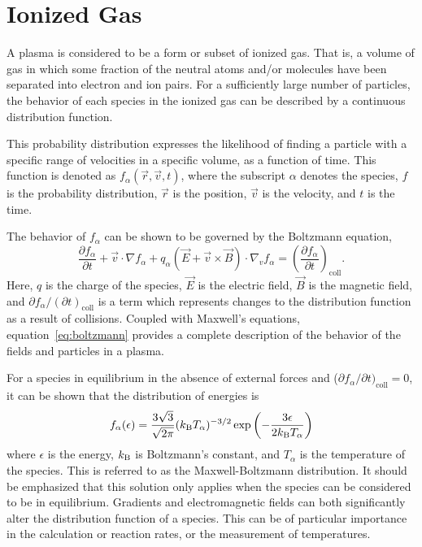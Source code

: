 

\section{Ionized Gas}
A plasma is considered to be a form or subset of ionized gas. That is, a volume
of gas in which some fraction of the neutral atoms and/or molecules have been
separated into electron and ion pairs. For a sufficiently large number of
particles, the behavior of each species in the ionized gas can be described by a
continuous distribution function.

This probability distribution expresses the likelihood of finding a particle
with a specific range of velocities in a specific volume, as a function of time.
This function is denoted as $f_\alpha(\vec{r}, \vec{v}, t)$, where
the subscript $\alpha$ denotes the species, $f$ is the probability distribution,
$\vec{r}$ is the position, $\vec{v}$ is the velocity, and $t$ is the time.

The behavior of $f_\alpha$ can be shown to be governed by the Boltzmann
equation,
\begin{equation}\label{eq:boltzmann}
  \frac{\partial f_\alpha}{\partial t} + \vec{v}\cdot\nabla f_\alpha +
  q_\alpha \left(\vec{E} + \vec{v}\times\vec{B}\right)
  \cdot \nabla_v f_\alpha = \left( \frac{\partial f_\alpha}
  {\partial t}\right)_\mathrm{coll}.
\end{equation}
Here, $q$ is the charge of the species, $\vec{E}$ is the electric field,
$\vec{B}$ is the magnetic field, and $\partial f_\alpha/(\partial
t)_\mathrm{coll}$ is a term which represents changes to the distribution
function as a result of collisions. Coupled with Maxwell's equations,
equation~\ref{eq:boltzmann} provides a complete description of the behavior of
the fields and particles in a plasma.

For a species in equilibrium in the absence of external forces and ($\partial
f_\alpha/\partial t)_\mathrm{coll} = 0$, it can be shown that the distribution
of energies is
\begin{equation}\label{eq:mb}
  f_{\alpha}(\epsilon) = \frac{3\sqrt{3}}{\sqrt{2\pi}}(k_\mathrm{B} T_\alpha)^{-3/2}
                        \exp{\left(-\frac{3\epsilon}{2k_\mathrm{B}T_\alpha}\right)}
\end{equation}
where $\epsilon$ is the energy, $k_\mathrm{B}$ is Boltzmann's constant, and $T_\alpha$ is
the temperature of the species. This is referred to as the Maxwell-Boltzmann
distribution. It should be emphasized that this solution only applies when the
species can be considered to be in equilibrium. Gradients and electromagnetic
fields can both significantly alter the distribution function of a species. This
can be of particular importance in the calculation or reaction rates, or the
measurement of temperatures.

